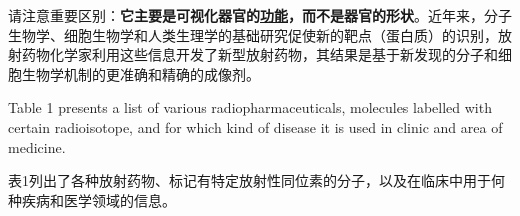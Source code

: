\documentclass[dvipsnames, svgnames,a4paper,11pt]{article}
\begin{document}
请注意重要区别：\textbf{它主要是可视化器官的\underline{功能}，而不是器官的形状}。近年来，分子生物学、细胞生物学和人类生理学的基础研究促使新的靶点（蛋白质）的识别，放射药物化学家利用这些信息开发了新型放射药物，其结果是基于新发现的分子和细胞生物学机制的更准确和精确的成像剂。

Table 1 presents a list of various radiopharmaceuticals, molecules labelled with certain radioisotope, and for which kind of disease it is used in clinic and area of medicine.

表1列出了各种放射药物、标记有特定放射性同位素的分子，以及在临床中用于何种疾病和医学领域的信息。



\begin{table}[H]
      \centering
       \label{tabel1}
      \begin{tabular}{|p{3.5cm}<{\centering}|p{7.5cm}<{\centering}|p{6cm}<{\centering}|p{5cm}<{\centering}|}
  

\end{tabular}
\end{table}
\end{document}
